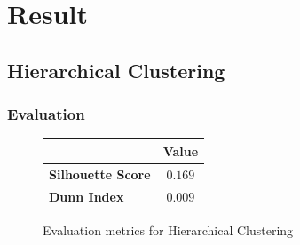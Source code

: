 \vspace{-0.2cm}
\section{Result}
\vspace{-0.1cm}
\subsection{Hierarchical Clustering}

\subsubsection{Evaluation}

\begin{figure}[H]
    \centering
    \begin{tabular}{|l|c|}
        \hline
        \rowcolor{gray!50}
        & Value \\ \hline
        \textbf{Silhouette Score} & $0.169$ \\ \hline
        \textbf{Dunn Index} & $0.009$ \\ \hline
    \end{tabular}
    \vspace{-0.1cm}
    \caption{Evaluation metrics for Hierarchical Clustering}\label{fig:Hierarchical_evaluation}
    \vspace{-0.2cm}
\end{figure}
